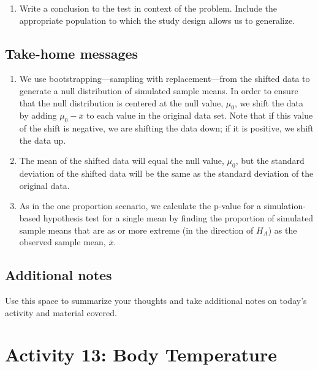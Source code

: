 \documentclass[
]{report}
\providecommand{\tightlist}{%
  \setlength{\itemsep}{0pt}\setlength{\parskip}{0pt}}
\begin{document}
\vspace{1in}

\begin{enumerate}
\def\labelenumi{\arabic{enumi}.}
\setcounter{enumi}{10}
\tightlist
\item
  Write a conclusion to the test in context of the problem. Include the appropriate population to which the study design allows us to generalize.
\end{enumerate}

\vspace{1in}

\subsection{Take-home messages}\label{take-home-messages-11}

\begin{enumerate}
\def\labelenumi{\arabic{enumi}.}
\item
  We use bootstrapping---sampling with replacement---from the shifted data to generate a null distribution of simulated sample means. In order to ensure that the null distribution is centered at the null value, \(\mu_0\), we shift the data by adding \(\mu_0 - \bar{x}\) to each value in the original data set. Note that if this value of the shift is negative, we are shifting the data down; if it is positive, we shift the data up.
\item
  The mean of the shifted data will equal the null value, \(\mu_0\), but the standard deviation of the shifted data will be the same as the standard deviation of the original data.
\item
  As in the one proportion scenario, we calculate the p-value for a simulation-based hypothesis test for a single mean by finding the proportion of simulated sample means that are as or more extreme (in the direction of \(H_A\)) as the observed sample mean, \(\bar{x}\).
\end{enumerate}

\subsection{Additional notes}\label{additional-notes-11}

Use this space to summarize your thoughts and take additional notes on today's activity and material covered.

\newpage

\section{Activity 13: Body Temperature}\label{activity-13-body-temperature}
\end{document}
